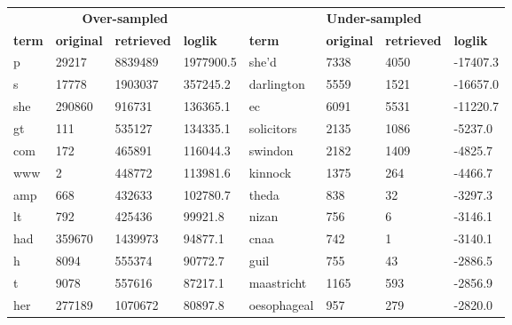 \begin{table}[hb]
    \centering
    \begin{tabular}{@{}llll||llll@{}}
        \hline
        \multicolumn{4}{c||}{{\bf Over-sampled}}                       & \multicolumn{4}{c}{{\bf Under-sampled}}                         \\ 
        {\bf term} & {\bf original} & {\bf retrieved} & {\bf loglik} & {\bf term}    & {\bf original} & {\bf retrieved} & {\bf loglik} \\ \hline
        p          & 29217          & 8839489         & 1977900.5    & she'd         & 7338           & 4050            & -17407.3     \\
        s          & 17778          & 1903037         & 357245.2     & darlington    & 5559           & 1521            & -16657.0     \\
        she        & 290860         & 916731          & 136365.1     & ec            & 6091           & 5531            & -11220.7     \\
        gt         & 111            & 535127          & 134335.1     & solicitors    & 2135           & 1086            & -5237.0      \\
        com        & 172            & 465891          & 116044.3     & swindon       & 2182           & 1409            & -4825.7      \\
        www        & 2              & 448772          & 113981.6     & kinnock       & 1375           & 264             & -4466.7      \\
        amp        & 668            & 432633          & 102780.7     & theda         & 838            & 32              & -3297.3      \\
        lt         & 792            & 425436          & 99921.8      & nizan         & 756            & 6               & -3146.1      \\
        had        & 359670         & 1439973         & 94877.1      & cnaa          & 742            & 1               & -3140.1      \\
        h          & 8094           & 555374          & 90772.7      & guil          & 755            & 43              & -2886.5      \\
        t          & 9078           & 557616          & 87217.1      & maastricht    & 1165           & 593             & -2856.9      \\
        her        & 277189         & 1070672         & 80897.8      & oesophageal   & 957            & 279             & -2820.0      \\

\end{tabular}
\end{table}
